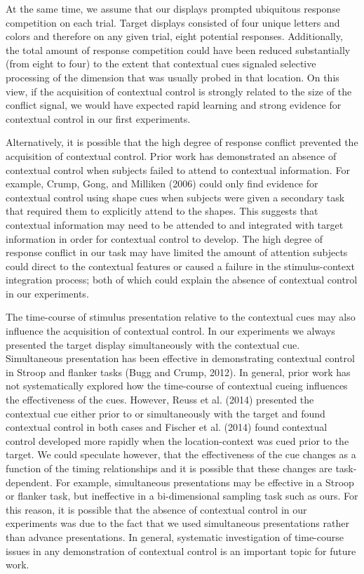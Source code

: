 \documentclass[]{DissertateCUNY}
\begin{document}
At the same time, we assume that our displays prompted ubiquitous
response competition on each trial. Target displays consisted of four
unique letters and colors and therefore on any given trial, eight
potential responses. Additionally, the total amount of response
competition could have been reduced substantially (from eight to four)
to the extent that contextual cues signaled selective processing of the
dimension that was usually probed in that location. On this view, if the
acquisition of contextual control is strongly related to the size of the
conflict signal, we would have expected rapid learning and strong
evidence for contextual control in our first experiments.

Alternatively, it is possible that the high degree of response conflict
prevented the acquisition of contextual control. Prior work has
demonstrated an absence of contextual control when subjects failed to
attend to contextual information. For example, Crump, Gong, and Milliken
(2006) could only find evidence for contextual control using shape cues
when subjects were given a secondary task that required them to
explicitly attend to the shapes. This suggests that contextual
information may need to be attended to and integrated with target
information in order for contextual control to develop. The high degree
of response conflict in our task may have limited the amount of
attention subjects could direct to the contextual features or caused a
failure in the stimulus-context integration process; both of which could
explain the absence of contextual control in our experiments.

The time-course of stimulus presentation relative to the contextual cues
may also influence the acquisition of contextual control. In our
experiments we always presented the target display simultaneously with
the contextual cue. Simultaneous presentation has been effective in
demonstrating contextual control in Stroop and flanker tasks (Bugg and
Crump, 2012). In general, prior work has not systematically explored how
the time-course of contextual cueing influences the effectiveness of the
cues. However, Reuss et al. (2014) presented the contextual cue either
prior to or simultaneously with the target and found contextual control
in both cases and Fischer et al. (2014) found contextual control
developed more rapidly when the location-context was cued prior to the
target. We could speculate however, that the effectiveness of the cue
changes as a function of the timing relationships and it is possible
that these changes are task-dependent. For example, simultaneous
presentations may be effective in a Stroop or flanker task, but
ineffective in a bi-dimensional sampling task such as ours. For this
reason, it is possible that the absence of contextual control in our
experiments was due to the fact that we used simultaneous presentations
rather than advance presentations. In general, systematic investigation
of time-course issues in any demonstration of contextual control is an
important topic for future work.
\end{document}
